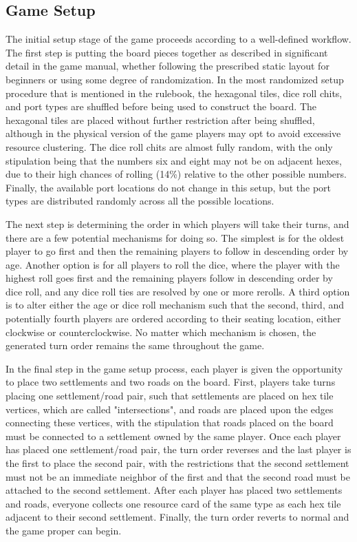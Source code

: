 \documentclass[pageno]{jpaper}
\begin{document}
\begin{doublespacing}
\hypertarget{sec:game_setup}{}
\subsection{Game Setup}

The initial setup stage of the game proceeds according to a well-defined workflow. The first step is putting the board pieces together as described in significant detail in the game manual, whether following the prescribed static layout for beginners or using some degree of randomization. In the most randomized setup procedure that is mentioned in the rulebook, the hexagonal tiles, dice roll chits, and port types are shuffled before being used to construct the board. The hexagonal tiles are placed without further restriction after being shuffled, although in the physical version of the game players may opt to avoid excessive resource clustering. The dice roll chits are almost fully random, with the only stipulation being that the numbers six and eight may not be on adjacent hexes, due to their high chances of rolling (14\%) relative to the other possible numbers. Finally, the available port locations do not change in this setup, but the port types are distributed randomly across all the possible locations.

The next step is determining the order in which players will take their turns, and there are a few potential mechanisms for doing so. The simplest is for the oldest player to go first and then the remaining players to follow in descending order by age. Another option is for all players to roll the dice, where the player with the highest roll goes first and the remaining players follow in descending order by dice roll, and any dice roll ties are resolved by one or more rerolls. A third option is to alter either the age or dice roll mechanism such that the second, third, and potentially fourth players are ordered according to their seating location, either clockwise or counterclockwise. No matter which mechanism is chosen, the generated turn order remains the same throughout the game.

In the final step in the game setup process, each player is given the opportunity to place two settlements and two roads on the board. First, players take turns placing one settlement/road pair, such that settlements are placed on hex tile vertices, which are called "intersections", and roads are placed upon the edges connecting these vertices, with the stipulation that roads placed on the board must be connected to a settlement owned by the same player. Once each player has placed one settlement/road pair, the turn order reverses and the last player is the first to place the second pair, with the restrictions that the second settlement must not be an immediate neighbor of the first and that the second road must be attached to the second settlement. After each player has placed two settlements and roads, everyone collects one resource card of the same type as each hex tile adjacent to their second settlement. Finally, the turn order reverts to normal and the game proper can begin.


\end{doublespacing}
\end{document}
